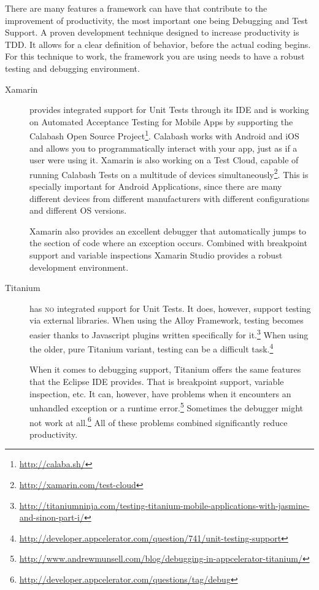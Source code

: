 There are many features a framework can have that contribute to the improvement of productivity, the most important one being Debugging and Test Support. A proven development technique designed to increase productivity is \ac{TDD}. It allows for a clear definition of behavior, before the actual coding begins. For this technique to work, the framework you are using needs to have a robust testing and debugging environment.

\begin{description}
\item[Xamarin] provides integrated support for Unit Tests through its \ac{IDE} and is working on Automated Acceptance Testing for Mobile Apps by supporting the Calabash Open Source Project\footnote{\url{http://calaba.sh/}}. Calabash works with Android and iOS and allows you to programmatically interact with your app, just as if a user were using it. Xamarin is also working on a Test Cloud, capable of running Calabash Tests on a multitude of devices simultaneously\footnote{\url{http://xamarin.com/test-cloud}}. This is specially important for Android Applications, since there are many different devices from different manufacturers with different configurations and different \ac{OS} versions.

Xamarin also provides an excellent debugger that automatically jumps to the section of code where an exception occurs. Combined with breakpoint support and variable inspections Xamarin Studio provides a robust development environment.

\item[Titanium] has \textsc{no} integrated support for Unit Tests. It does, however, support testing via external libraries. When using the Alloy Framework, testing becomes easier thanks to Javascript plugins written specifically for it.\footnote{\url{http://titaniumninja.com/testing-titanium-mobile-applications-with-jasmine-and-sinon-part-i/}} When using the older, pure Titanium variant, testing can be a difficult task.\footnote{\url{http://developer.appcelerator.com/question/741/unit-testing-support}}

When it comes to debugging support, Titanium offers the same features that the Eclipse \ac{IDE} provides. That is breakpoint support, variable inspection, etc. It can, however, have problems when it encounters an unhandled exception or a runtime error.\footnote{\url{http://www.andrewmunsell.com/blog/debugging-in-appcelerator-titanium/}} Sometimes the debugger might not work at all.\footnote{\url{http://developer.appcelerator.com/questions/tag/debug}} All of these problems combined significantly reduce productivity.    
\end{description}


